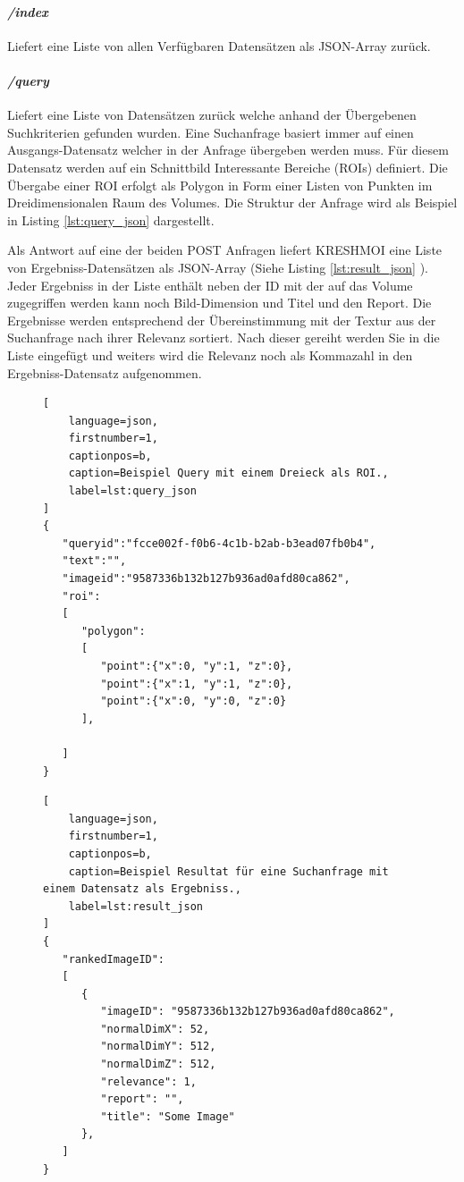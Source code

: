 \paragraph{\textit{/index}}
Liefert eine Liste von allen Verfügbaren Datensätzen als JSON-Array zurück.
%
\paragraph{\textit{/query}}
Liefert eine Liste von Datensätzen zurück welche anhand der Übergebenen Suchkriterien gefunden wurden.
Eine Suchanfrage basiert immer auf einen Ausgangs-Datensatz welcher in der Anfrage übergeben werden muss.
Für diesem Datensatz werden auf ein Schnittbild Interessante Bereiche (ROIs) definiert.
Die Übergabe einer ROI erfolgt als Polygon in Form einer Listen von Punkten im Dreidimensionalen Raum des Volumes.
Die Struktur der Anfrage wird als Beispiel in Listing \ref{lst:query_json} dargestellt.

Als Antwort auf eine der beiden POST Anfragen liefert KRESHMOI eine Liste von Ergebniss-Datensätzen als JSON-Array (Siehe Listing \ref{lst:result_json} ). 
Jeder Ergebniss in der Liste enthält neben der ID mit der auf das Volume zugegriffen werden kann noch Bild-Dimension und Titel und den Report.
Die Ergebnisse werden entsprechend der Übereinstimmung mit der Textur aus der Suchanfrage nach ihrer Relevanz sortiert. 
Nach dieser gereiht werden Sie in die Liste eingefügt und weiters wird die Relevanz noch als Kommazahl in den Ergebniss-Datensatz aufgenommen.
\begin{figure}[t]
\begin{lstlisting}[
	language=json,
	firstnumber=1,
	captionpos=b,
	caption=Beispiel Query mit einem Dreieck als ROI.,
	label=lst:query_json
]
{
   "queryid":"fcce002f-f0b6-4c1b-b2ab-b3ead07fb0b4",
   "text":"",
   "imageid":"9587336b132b127b936ad0afd80ca862",
   "roi": 
   [
      "polygon":
      [
         "point":{"x":0, "y":1, "z":0},
         "point":{"x":1, "y":1, "z":0},
         "point":{"x":0, "y":0, "z":0}
      ],

   ]
}
\end{lstlisting}
\end{figure}


\begin{figure}[t]
\begin{lstlisting}[
	language=json,
	firstnumber=1,
	captionpos=b,
	caption=Beispiel Resultat für eine Suchanfrage mit einem Datensatz als Ergebniss.,
	label=lst:result_json
]
{
   "rankedImageID": 
   [
      {
         "imageID": "9587336b132b127b936ad0afd80ca862",
         "normalDimX": 52,
         "normalDimY": 512,
         "normalDimZ": 512,
         "relevance": 1,
         "report": "",
         "title": "Some Image"
      },
   ]
}
\end{lstlisting}
\end{figure}

